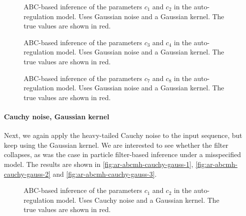 \begin{figure}[htp]%
    \centering
    \qquad
    \caption{ABC-based inference of the parameters $c_1$ and $c_2$ in the auto-regulation model. Uses Gaussian noise and a Gaussian kernel. The true values are shown in red.}%
    \label{fig:ar-abcmh-gauss-gauss-1}%
\end{figure}

\begin{figure}[htp]%
    \centering
    \qquad
    \caption{ABC-based inference of the parameters $c_3$ and $c_4$ in the auto-regulation model. Uses Gaussian noise and a Gaussian kernel. The true values are shown in red.}%
    \label{fig:ar-abcmh-gauss-gauss-2}%
\end{figure}

\begin{figure}[htp]%
    \centering
    \qquad
    \caption{ABC-based inference of the parameters $c_7$ and $c_8$ in the auto-regulation model. Uses Gaussian noise and a Gaussian kernel. The true values are shown in red.}%
    \label{fig:ar-abcmh-gauss-gauss-3}%
\end{figure}


\paragraph{Cauchy noise, Gaussian kernel}
Next, we again apply the heavy-tailed Cauchy noise to the input sequence, but keep using the Gaussian kernel. We are interested to see whether the filter collapses, as was the case in particle filter-based inference under a misspecified model. The results are shown in \autoref{fig:ar-abcmh-cauchy-gauss-1}, \autoref{fig:ar-abcmh-cauchy-gauss-2} and \autoref{fig:ar-abcmh-cauchy-gauss-3}.

\begin{figure}[htp]%
    \centering
    \qquad
    \caption{ABC-based inference of the parameters $c_1$ and $c_2$ in the auto-regulation model. Uses Cauchy noise and a Gaussian kernel. The true values are shown in red.}%
    \label{fig:ar-abcmh-cauchy-gauss-1}%
\end{figure}

